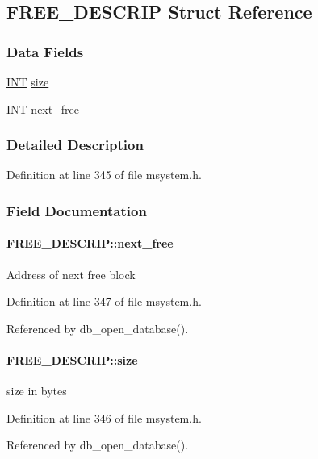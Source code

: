 \subsection{FREE\_\-DESCRIP Struct Reference}
\label{structFREE__DESCRIP}
\subsubsection*{Data Fields}
\begin{DoxyCompactItemize}
\item 
\hyperlink{vppg_8h_a392e62da233ed3e2f7c3fd4f487a3896}{INT} \hyperlink{structFREE__DESCRIP_a0d1fdeac1da84097111e7882de6727e2}{size}
\item 
\hyperlink{vppg_8h_a392e62da233ed3e2f7c3fd4f487a3896}{INT} \hyperlink{structFREE__DESCRIP_a609acc9c9229323c1646caa2950dcd18}{next\_\-free}
\end{DoxyCompactItemize}


\subsubsection{Detailed Description}


Definition at line 345 of file msystem.h.

\subsubsection{Field Documentation}
\paragraph[{next\_\-free}]{ {\bf FREE\_\-DESCRIP::next\_\-free}}\hfill\label{structFREE__DESCRIP_a609acc9c9229323c1646caa2950dcd18}
Address of next free block 

Definition at line 347 of file msystem.h.

Referenced by db\_\-open\_\-database().
\paragraph[{size}]{ {\bf FREE\_\-DESCRIP::size}}\hfill\label{structFREE__DESCRIP_a0d1fdeac1da84097111e7882de6727e2}
size in bytes 

Definition at line 346 of file msystem.h.

Referenced by db\_\-open\_\-database().